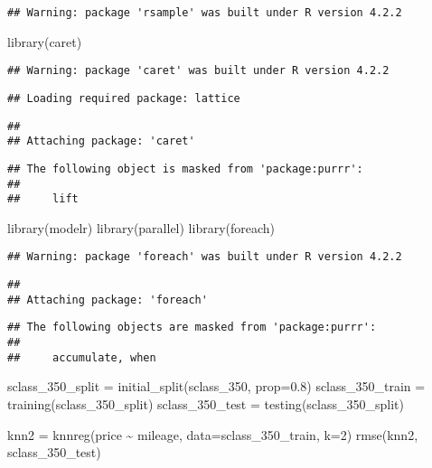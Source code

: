 \documentclass[
]{article}
\newenvironment{Shaded}{\begin{snugshade}}{\end{snugshade}}
\newcommand{\AttributeTok}[1]{\textcolor[rgb]{0.77,0.63,0.00}{#1}}
\newcommand{\DecValTok}[1]{\textcolor[rgb]{0.00,0.00,0.81}{#1}}
\newcommand{\FloatTok}[1]{\textcolor[rgb]{0.00,0.00,0.81}{#1}}
\newcommand{\FunctionTok}[1]{\textcolor[rgb]{0.00,0.00,0.00}{#1}}
\newcommand{\NormalTok}[1]{#1}
\newcommand{\OtherTok}[1]{\textcolor[rgb]{0.56,0.35,0.01}{#1}}
\newcommand{\SpecialCharTok}[1]{\textcolor[rgb]{0.00,0.00,0.00}{#1}}
\begin{document}
\begin{verbatim}
## Warning: package 'rsample' was built under R version 4.2.2
\end{verbatim}

\begin{Shaded}
\begin{Highlighting}[]
\FunctionTok{library}\NormalTok{(caret)}
\end{Highlighting}
\end{Shaded}

\begin{verbatim}
## Warning: package 'caret' was built under R version 4.2.2
\end{verbatim}

\begin{verbatim}
## Loading required package: lattice
\end{verbatim}

\begin{verbatim}
## 
## Attaching package: 'caret'
\end{verbatim}

\begin{verbatim}
## The following object is masked from 'package:purrr':
## 
##     lift
\end{verbatim}

\begin{Shaded}
\begin{Highlighting}[]
\FunctionTok{library}\NormalTok{(modelr)}
\FunctionTok{library}\NormalTok{(parallel)}
\FunctionTok{library}\NormalTok{(foreach)}
\end{Highlighting}
\end{Shaded}

\begin{verbatim}
## Warning: package 'foreach' was built under R version 4.2.2
\end{verbatim}

\begin{verbatim}
## 
## Attaching package: 'foreach'
\end{verbatim}

\begin{verbatim}
## The following objects are masked from 'package:purrr':
## 
##     accumulate, when
\end{verbatim}

\begin{Shaded}
\begin{Highlighting}[]
\NormalTok{sclass\_350\_split }\OtherTok{=} \FunctionTok{initial\_split}\NormalTok{(sclass\_350, }\AttributeTok{prop=}\FloatTok{0.8}\NormalTok{)}
\NormalTok{sclass\_350\_train }\OtherTok{=} \FunctionTok{training}\NormalTok{(sclass\_350\_split)}
\NormalTok{sclass\_350\_test }\OtherTok{=} \FunctionTok{testing}\NormalTok{(sclass\_350\_split)}

\NormalTok{knn2 }\OtherTok{=} \FunctionTok{knnreg}\NormalTok{(price }\SpecialCharTok{\textasciitilde{}}\NormalTok{ mileage, }\AttributeTok{data=}\NormalTok{sclass\_350\_train, }\AttributeTok{k=}\DecValTok{2}\NormalTok{)}
\FunctionTok{rmse}\NormalTok{(knn2, sclass\_350\_test)}
\end{Highlighting}
\end{Shaded}
\end{document}
